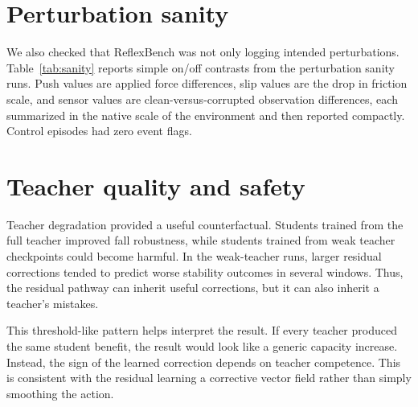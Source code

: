 \documentclass[11pt]{article}
\begin{document}
\section{Perturbation sanity}
We also checked that ReflexBench was not only logging intended perturbations.  Table~\ref{tab:sanity} reports simple on/off contrasts from the perturbation sanity runs.  Push values are applied force differences, slip values are the drop in friction scale, and sensor values are clean-versus-corrupted observation differences, each summarized in the native scale of the environment and then reported compactly.  Control episodes had zero event flags.

\begin{table}[h]
\centering
\small

\caption{Compact perturbation sanity checks.  Nonzero push/slip/sensor contrasts confirm that the perturbations were actually applied.}
\label{tab:sanity}
\end{table}

\section{Teacher quality and safety}
Teacher degradation provided a useful counterfactual.  Students trained from the full teacher improved fall robustness, while students trained from weak teacher checkpoints could become harmful.  In the weak-teacher runs, larger residual corrections tended to predict worse stability outcomes in several windows.  Thus, the residual pathway can inherit useful corrections, but it can also inherit a teacher's mistakes.

\begin{table}[h]
\centering
\small

\caption{Teacher-quality replication.  Negative fall deltas are helpful; positive fall deltas are harmful.}
\label{tab:teacher}
\end{table}

This threshold-like pattern helps interpret the result.  If every teacher produced the same student benefit, the result would look like a generic capacity increase.  Instead, the sign of the learned correction depends on teacher competence.  This is consistent with the residual learning a corrective vector field rather than simply smoothing the action.
\end{document}
